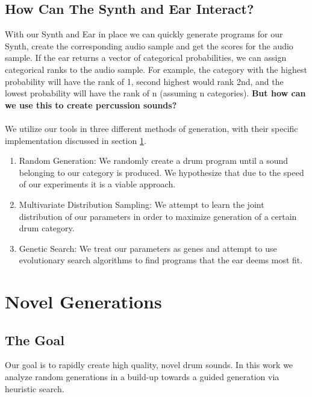 \documentclass{nime-alternate} %
\begin{document}
\subsection{How Can The Synth and Ear Interact?}
With our Synth and Ear in place we can quickly generate programs for our Synth, create the corresponding audio sample and get the scores for the audio sample. If the ear returns a vector of categorical probabilities, we can assign categorical ranks to the audio sample. For example, the category with the highest probability will have the rank of 1, second highest would rank 2nd, and the lowest probability will have the rank of n (assuming n categories).\textbf{
But how can we use this to create percussion sounds?}\\\\
We utilize our tools in three different methods of generation, with their specific implementation discussed in section \ref{gens}.
\begin {enumerate} [label=(\roman*)]
\item Random Generation: We randomly create a drum program until a sound belonging to our category is produced. We hypothesize that due to the speed of our experiments it is a viable approach.
\item Multivariate Distribution Sampling: We attempt to learn the joint distribution of our parameters in order to maximize generation of a certain drum category. 
\item Genetic Search: We treat our parameters as genes and attempt to use evolutionary search algorithms to find programs that the ear deems most fit.\\
\end {enumerate} 

\section{Novel Generations}
\label{gens}
\subsection{The Goal}
 Our goal is to rapidly create high quality, novel drum sounds. In this work we analyze random generations in a build-up towards a guided generation via heuristic search.
\end{document}
